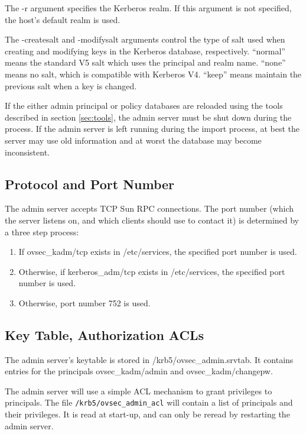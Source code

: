 The -r argument specifies the Kerberos realm.  If this argument is not
specified, the host's default realm is used. 

The -createsalt and -modifysalt arguments control the type of salt
used when creating and modifying keys in the Kerberos database,
respectively.  ``normal'' means the standard V5 salt which uses the
principal and realm name.  ``none'' means no salt, which is compatible
with Kerberos V4.  ``keep'' means maintain the previous salt when a
key is changed.

If the either admin principal or policy databases are reloaded using
the tools described in section \ref{sec:tools}, the admin server must
be shut down during the process.  If the admin server is left running
during the import process, at best the server may use old information
and at worst the database may become inconsistent.

\subsection{Protocol and Port Number}

The admin server accepts TCP Sun RPC connections.  The port number
(which the server listens on, and which clients should use to contact
it) is determined by a three step process:

\begin{enumerate}
\item If ovsec_kadm/tcp exists in /etc/services, the specified port
number is used.

\item Otherwise, if kerberos_adm/tcp exists in /etc/services, the
specified port number is used.

\item Otherwise, port number 752 is used.
\end{enumerate}

\subsection{Key Table, Authorization ACLs}
\label{sec:acls}

The admin server's keytable is stored in /krb5/ovsec_admin.srvtab.  It
contains entries for the principals ovsec_kadm/admin and
ovsec_kadm/changepw.

The admin server will use a simple ACL mechanism to grant privileges
to principals.  The file {\tt /krb5/ovsec_admin_acl} will contain a
list of principals and their privileges.  It is read at start-up, and
can only be reread by restarting the admin server.

